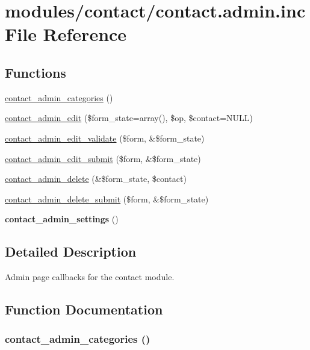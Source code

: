 \hypertarget{contact_8admin_8inc}{
\section{modules/contact/contact.admin.inc File Reference}
\label{contact_8admin_8inc}
}
\subsection*{Functions}
\begin{CompactItemize}
\item 
\hyperlink{contact_8admin_8inc_3deff5e9a0dff51c680faad3c3170b96}{contact\_\-admin\_\-categories} ()
\item 
\hyperlink{contact_8admin_8inc_5ca6a5a6a6782c03fa2c8355595e5325}{contact\_\-admin\_\-edit} (\$form\_\-state=array(), \$op, \$contact=NULL)
\item 
\hyperlink{contact_8admin_8inc_9ec44b6faaab7225ef53eb714f08d9a2}{contact\_\-admin\_\-edit\_\-validate} (\$form, \&\$form\_\-state)
\item 
\hyperlink{contact_8admin_8inc_8eef340a2f198b887ea177273ab566a5}{contact\_\-admin\_\-edit\_\-submit} (\$form, \&\$form\_\-state)
\item 
\hyperlink{contact_8admin_8inc_c78c28a9e0308300c1e89223ea6984d9}{contact\_\-admin\_\-delete} (\&\$form\_\-state, \$contact)
\item 
\hyperlink{contact_8admin_8inc_9fb0a8959ab954f593d7d08ff3c748e9}{contact\_\-admin\_\-delete\_\-submit} (\$form, \&\$form\_\-state)
\item 
\hypertarget{contact_8admin_8inc_1861761b083d48e1e5a186c4e0435c03}{
\textbf{contact\_\-admin\_\-settings} ()}
\label{contact_8admin_8inc_1861761b083d48e1e5a186c4e0435c03}

\end{CompactItemize}


\subsection{Detailed Description}
Admin page callbacks for the contact module. 

\subsection{Function Documentation}
\hypertarget{contact_8admin_8inc_3deff5e9a0dff51c680faad3c3170b96}{
\subsubsection[{contact\_\-admin\_\-categories}]{\setlength{\rightskip}{0pt plus 5cm}contact\_\-admin\_\-categories ()}}
\label{contact_8admin_8inc_3deff5e9a0dff51c680faad3c3170b96}


